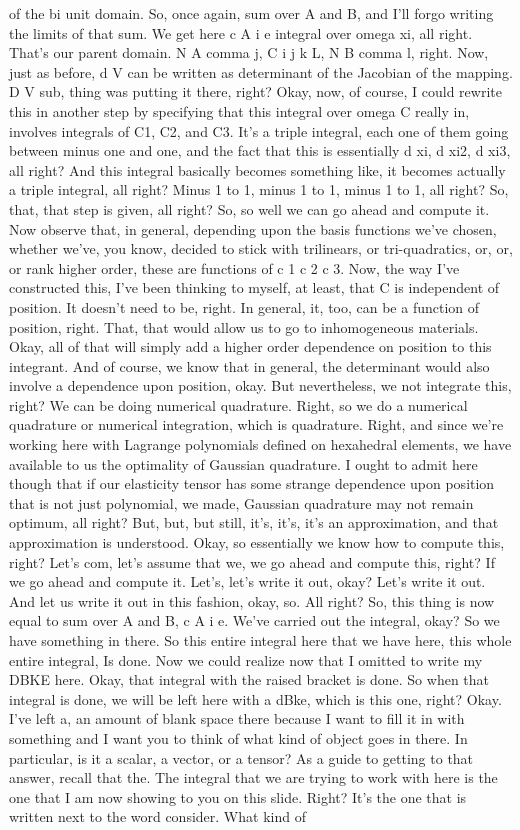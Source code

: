 \documentclass[10pt]{article}
\begin{document}
of the bi unit domain. So, once again, sum over A and B, and I'll forgo writing the limits of that sum. We get here c A i e integral over omega xi, all right. That's our parent domain. N A comma j, C i j k L, N B comma l, right. Now, just as before, d V can be written as determinant of the Jacobian of the mapping. D V sub, thing was putting it there, right? Okay, now, of course, I could rewrite this in another step by specifying that this integral over omega C really in, involves integrals of C1, C2, and C3. It's a triple integral, each one of them going between minus one and one, and the fact that this is essentially d xi, d xi2, d xi3, all right? And this integral basically becomes something like, it becomes actually a triple integral, all right? Minus 1 to 1, minus 1 to 1, minus 1 to 1, all right? So, that, that step is given, all right? So, so well we can go ahead and compute it. Now observe that, in general, depending upon the basis functions we've chosen, whether we've, you know, decided to stick with trilinears, or tri-quadratics, or, or, or rank higher order, these are functions of c 1 c 2 c 3. Now, the way I've constructed this, I've been thinking to myself, at least, that C is independent of position. It doesn't need to be, right. In general, it, too, can be a function of position, right. That, that would allow us to go to inhomogeneous materials. Okay, all of that will simply add a higher order dependence on position to this integrant. And of course, we know that in general, the determinant would also involve a dependence upon position, okay. But nevertheless, we not integrate this, right? We can be doing numerical quadrature. Right, so we do a numerical quadrature or numerical integration, which is quadrature. Right, and since we're working here with Lagrange polynomials defined on hexahedral elements, we have available to us the optimality of Gaussian quadrature. I ought to admit here though that if our elasticity tensor has some strange dependence upon position that is not just polynomial, we made, Gaussian quadrature may not remain optimum, all right? But, but, but still, it's, it's, it's an approximation, and that approximation is understood. Okay, so essentially we know how to compute this, right? Let's com, let's assume that we, we go ahead and compute this, right? If we go ahead and compute it. Let's, let's write it out, okay? Let's write it out. And let us write it out in this fashion, okay, so. All right? So, this thing is now equal to sum over A and B, c A i e. We've carried out the integral, okay? So we have something in there. So this entire integral here that we have here, this whole entire integral, Is done. Now we could realize now that I omitted to write my DBKE here. Okay, that integral with the raised bracket is done. So when that integral is done, we will be left here with a dBke, which is this one, right? Okay. I've left a, an amount of blank space there because I want to fill it in with something and I want you to think of what kind of object goes in there. In particular, is it a scalar, a vector, or a tensor? As a guide to getting to that answer, recall that the. The integral that we are trying to work with here is the one that I am now showing to you on this slide. Right? It's the one that is written next to the word consider. What kind of 
\end{document}
